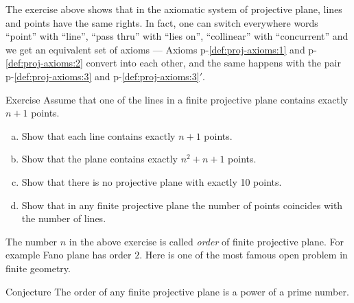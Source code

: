The exercise above shows that in the axiomatic system of projective plane,
lines and points have the same rights.
In fact, one can switch everywhere words ``point'' with ``line'', ``pass thru'' with ``lies on'', ``collinear'' with ``concurrent'' and we get an equivalent set of axioms ---  Axioms p-\ref{def:proj-axioms:1} and p-\ref{def:proj-axioms:2} convert into each other,
and the same happens with the pair p-\ref{def:proj-axioms:3} and p-\ref{def:proj-axioms:3}$'$.

\begin{thm}{Exercise}\label{ex:oder}
Assume that one of the lines in a finite projective plane contains exactly $n+1$ points.
\begin{enumerate}[(a)]
\item\label{ex:oder:a} Show that each line contains exactly $n+1$ points.
\item\label{ex:oder:b} Show that the plane contains  exactly $n^2+n+1$ points.
\item\label{ex:oder:c} Show that there is no projective plane with exactly 10 points.
\item\label{ex:oder:d} Show that in any finite projective plane the number of points coincides with the number of lines.
\end{enumerate}
\end{thm}

The number $n$ in the above exercise is called \emph{order} of finite projective plane.
For example Fano plane has order $2$.
Here is one of the most famous open problem in finite geometry.

\begin{thm}{Conjecture}
The order of any finite projective plane is a power of a prime number.
\end{thm}

